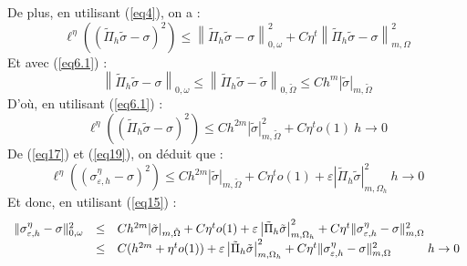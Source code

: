 \documentclass{article}
\begin{document}
\begin{dem}
De plus, en utilisant (\ref{eq4}), on a :
\[\ell^\eta \left(\left(\tilde{\Pi}_h\tilde{\sigma}-\sigma\right)^2\right)\leq \left\| \tilde{\Pi}_h\tilde{\sigma} -\sigma\right\|^2_{0,\omega}+C\eta^t \left\| \tilde{\Pi}_h\tilde{\sigma} -\sigma\right\|^2_{m,\Omega}\]
Et avec (\ref{eq6.1}) :
\[\left\| \tilde{\Pi}_h\tilde{\sigma} -\sigma\right\|_{0,\omega}\leq \left\| \tilde{\Pi}_h\tilde{\sigma} -\tilde{\sigma}\right\|_{0,\tilde{\Omega}}\leq Ch^m |\tilde{\sigma}|_{m,\tilde{\Omega}}\]
D'où, en utilisant (\ref{eq6.1}) :
\begin{equation} \label{eq19} \ell^\eta \left(\left( \tilde{\Pi}_h\tilde{\sigma}-\sigma\right)^2\right) \leq Ch^{2m}|\tilde{\sigma}|^2_{m,\tilde{\Omega}} +C\eta^t o(1)\ h\to 0 \end{equation}
De (\ref{eq17}) et (\ref{eq19}), on déduit que :
\begin{equation}\label{eq20}  \ell^\eta \left( \left( \sigma_{\varepsilon,h}^\eta-\sigma\right)^2\right)\leq Ch^{2m}|\tilde{\sigma}|_{m,\tilde{\Omega}} + C\eta^to(1)+\varepsilon \left|\tilde{\Pi}_h\tilde{\sigma}\right|^2_{m,\Omega_h}\ h\to 0 \end{equation}
Et donc, en utilisant (\ref{eq15}) :
\begin{equation}\label{eq21}
\begin{array}{c c l}
	\|\sigma_{\varepsilon, h}^\eta - \sigma\|^2_{0,\omega}&\leq& Ch^{2m}|\tilde{\sigma}|_{m,\tilde{\Omega}} + C\eta^t o(1) + \varepsilon \left|\tilde{\Pi}_h\tilde{\sigma}\right|^2_{m,\Omega_h} + C\eta^t \|\sigma_{\varepsilon, h}^\eta - \sigma\|^2_{m,\Omega}\\
&\leq& C(h^{2m} + \eta^t o(1)) + \varepsilon \left|\tilde{\Pi}_h\tilde{\sigma}\right|^2_{m,\Omega_h} + C\eta^t\|\sigma_{\varepsilon, h}^\eta - \sigma\|^2_{m,\Omega}
\hspace{3em} h\to 0
\end{array}
\end{equation}


\end{dem}
\end{document}
